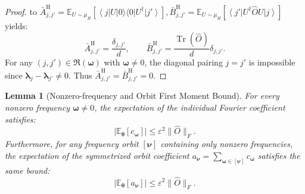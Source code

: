 \documentclass[%
 reprint,
 amsmath,amssymb,
 aps,
 pra,
]{revtex4-2}
\newtheorem{lemma}[theorem]{Lemma}
\theoremstyle{definition}
\begin{document}
\begin{proof}
to $\bar A^{\mathrm H}_{j,j'}=
\mathbb{E}_{U\sim\mu_H}
\left[
\left\langle j\right|
U|0\rangle\langle0|U^\dagger
\left|j'\right\rangle
\right]
\nonumber,
\bar B^{\mathrm H}_{j,j'}
=
\mathbb{E}_{U\sim\mu_H} \left[ \left\langle j'\right| U^\dagger\hat O U \left|j\right\rangle \right]$ yields:
\begin{equation}
\bar A^{\mathrm H}_{j,j'} = \frac{\delta_{j,j'}}{d}, \qquad \bar B^{\mathrm H}_{j,j'} = \frac{\operatorname{Tr}(\hat O)}{d}\delta_{j,j'}.
\end{equation}
For any $(j,j')\in\mathfrak R(\bm{\omega})$ with $\bm{\omega}\neq0$, the diagonal pairing $j=j'$ is impossible since $\bm{\lambda}_j-\bm{\lambda}_{j'}\neq 0$. Thus $\bar A^{\mathrm H}_{j,j'}=\bar B^{\mathrm H}_{j,j'}=0$.
\end{proof}


\begin{lemma}[Nonzero-frequency and Orbit First Moment Bound]
\label{lemma:nonzero_frequency_first_moment_bound}
For every nonzero frequency $\bm{\omega}\neq0$, the expectation of the individual Fourier coefficient satisfies:
\begin{equation}
\left| \mathbb{E}_{\bm{\theta}} \left[ c_{\bm{\omega}} \right] \right| \leq \varepsilon^2\|\hat O\|_F.
\end{equation}
Furthermore, for any frequency orbit $[\bm{\nu}]$ containing only nonzero frequencies, the expectation of the symmetrized orbit coefficient $a_{\bm{\nu}} = \sum_{\bm{\omega}\in[\bm{\nu}]} c_{\bm{\omega}}$ satisfies the same bound:
\begin{equation}
\left| \mathbb{E}_{\bm{\theta}} \left[ a_{\bm{\nu}} \right] \right| \leq \varepsilon^2\|\hat O\|_F.
\end{equation}
\end{lemma}
\end{document}
